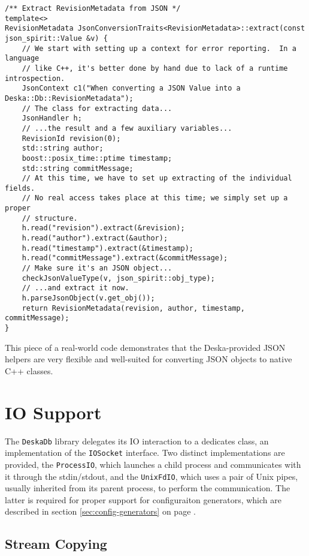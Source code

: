 \documentclass[deska]{subfiles}
\begin{document}
\begin{verbatim}
/** Extract RevisionMetadata from JSON */
template<>
RevisionMetadata JsonConversionTraits<RevisionMetadata>::extract(const json_spirit::Value &v) {
    // We start with setting up a context for error reporting.  In a language
    // like C++, it's better done by hand due to lack of a runtime introspection.
    JsonContext c1("When converting a JSON Value into a Deska::Db::RevisionMetadata");
    // The class for extracting data...
    JsonHandler h;
    // ...the result and a few auxiliary variables...
    RevisionId revision(0);
    std::string author;
    boost::posix_time::ptime timestamp;
    std::string commitMessage;
    // At this time, we have to set up extracting of the individual fields.
    // No real access takes place at this time; we simply set up a proper
    // structure.
    h.read("revision").extract(&revision);
    h.read("author").extract(&author);
    h.read("timestamp").extract(&timestamp);
    h.read("commitMessage").extract(&commitMessage);
    // Make sure it's an JSON object...
    checkJsonValueType(v, json_spirit::obj_type);
    // ...and extract it now.
    h.parseJsonObject(v.get_obj());
    return RevisionMetadata(revision, author, timestamp, commitMessage);
}
\end{verbatim}

This piece of a real-world code demonstrates that the Deska-provided JSON helpers are very flexible and well-suited for
converting JSON objects to native C++ classes.

\section{IO Support}

The {\tt DeskaDb} library delegates its IO interaction to a dedicates class, an implementation of the {\tt IOSocket}
interface.  Two distinct implementations are provided, the {\tt ProcessIO}, which launches a child process and
communicates with it through the stdin/stdout, and the {\tt UnixFdIO}, which uses a pair of Unix pipes, usually
inherited from its parent process, to perform the communication.  The latter is required for proper support for
configuraiton generators, which are described in section \ref{sec:config-generators} on page
\pageref{sec:config-generators}.

\subsection{Stream Copying}
\end{document}
